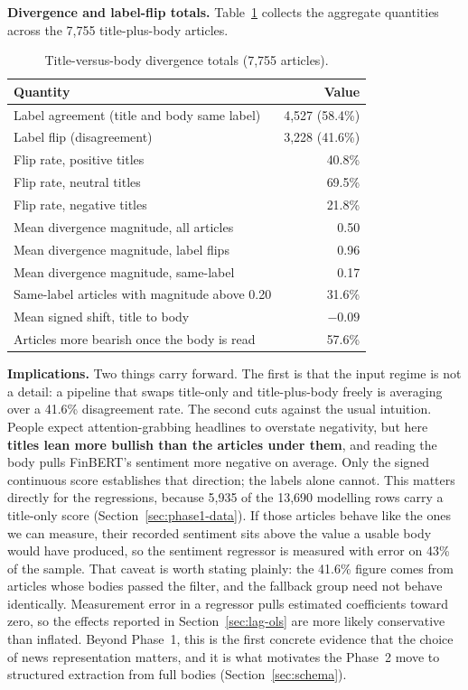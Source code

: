 \textbf{Divergence and label-flip totals.} Table~\ref{tab:headline-totals} collects the aggregate quantities across the 7{,}755 title-plus-body articles.

\begin{table}[h]
  \centering
  \caption{Title-versus-body divergence totals (7{,}755 articles).}
  \label{tab:headline-totals}
  \begin{tabular}{@{}lr@{}}
    \toprule
    Quantity & Value \\
    \midrule
    Label agreement (title and body same label) & 4{,}527 (58.4\%) \\
    Label flip (disagreement) & 3{,}228 (41.6\%) \\
    Flip rate, positive titles & 40.8\% \\
    Flip rate, neutral titles & 69.5\% \\
    Flip rate, negative titles & 21.8\% \\
    Mean divergence magnitude, all articles & 0.50 \\
    Mean divergence magnitude, label flips & 0.96 \\
    Mean divergence magnitude, same-label & 0.17 \\
    Same-label articles with magnitude above 0.20 & 31.6\% \\
    Mean signed shift, title to body & $-0.09$ \\
    Articles more bearish once the body is read & 57.6\% \\
    \bottomrule
  \end{tabular}
\end{table}

\textbf{Implications.} Two things carry forward. The first is that the input regime is not a detail: a pipeline that swaps title-only and title-plus-body freely is averaging over a 41.6\% disagreement rate. The second cuts against the usual intuition. People expect attention-grabbing headlines to overstate negativity, but here \textbf{titles lean more bullish than the articles under them}, and reading the body pulls FinBERT's sentiment more negative on average. Only the signed continuous score establishes that direction; the labels alone cannot. This matters directly for the regressions, because 5{,}935 of the 13{,}690 modelling rows carry a title-only score (Section~\ref{sec:phase1-data}). If those articles behave like the ones we can measure, their recorded sentiment sits above the value a usable body would have produced, so the sentiment regressor is measured with error on 43\% of the sample. That caveat is worth stating plainly: the 41.6\% figure comes from articles whose bodies passed the filter, and the fallback group need not behave identically. Measurement error in a regressor pulls estimated coefficients toward zero, so the effects reported in Section~\ref{sec:lag-ols} are more likely conservative than inflated. Beyond Phase~1, this is the first concrete evidence that the choice of news representation matters, and it is what motivates the Phase~2 move to structured extraction from full bodies (Section~\ref{sec:schema}).

